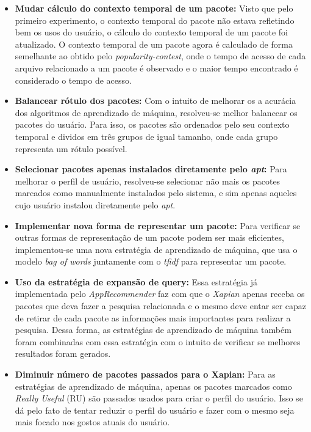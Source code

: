 \begin{itemize}
   \item \textbf{Mudar cálculo do contexto temporal de um pacote: } Visto que
   pelo primeiro experimento, o contexto temporal do pacote não estava
   refletindo bem os usos do usuário, o cálculo do contexto temporal de um
   pacote foi atualizado. O contexto temporal de um pacote agora é calculado de
   forma semelhante ao obtido pelo \textit{popularity-contest}, onde o tempo de
   acesso de cada arquivo relacionado a um pacote é observado e o maior tempo
   encontrado é considerado o tempo de acesso.

   \item \textbf{Balancear rótulo dos pacotes: } Com o intuito de melhorar os
   a acurácia dos algoritmos de aprendizado de máquina, resolveu-se melhor
   balancear os pacotes do usuário. Para isso, os pacotes são ordenados pelo seu
   contexto temporal e dividos em três grupos de igual tamanho, onde cada grupo
   representa um rótulo possível.

   \item \textbf{Selecionar pacotes apenas instalados diretamente pelo
   \textit{apt}:} Para melhorar o perfil de usuário, resolveu-se selecionar não
   mais os pacotes marcados como manualmente instalados pelo sistema, e sim
   apenas aqueles cujo usuário instalou diretamente pelo \textit{apt}.

   \item \textbf{Implementar nova forma de representar um pacote: } Para
   verificar se outras formas de representação de um pacote podem ser mais
   eficientes, implementou-se uma nova estratégia de aprendizado de máquina, que
   usa o modelo \textit{bag of words} juntamente com o \textit{tfidf} para
   representar um pacote.

   \item \textbf{Uso da estratégia de expansão de query: } Essa estratégia já
   implementada pelo \textit{AppRecommender} faz com que o \textit{Xapian}
   apenas receba os pacotes que deva fazer a pesquisa relacionada e o mesmo deve
   entar ser capaz de retirar de cada pacote as informações mais importantes
   para realizar a pesquisa. Dessa forma, as estratégias de aprendizado de
   máquina também foram combinadas com essa estratégia com o intuito de
   verificar se melhores resultados foram gerados.

   \item \textbf{Diminuir número de pacotes passados para o Xapian:} Para as
   estratégias de aprendizado de máquina, apenas os pacotes marcados como
   \textit{Really Useful} (RU) são passados usados para criar o perfil do
   usuário. Isso se dá pelo fato de tentar reduzir o perfil do usuário e fazer
   com o mesmo seja mais focado nos gostos atuais do usuário.


\end{itemize}
